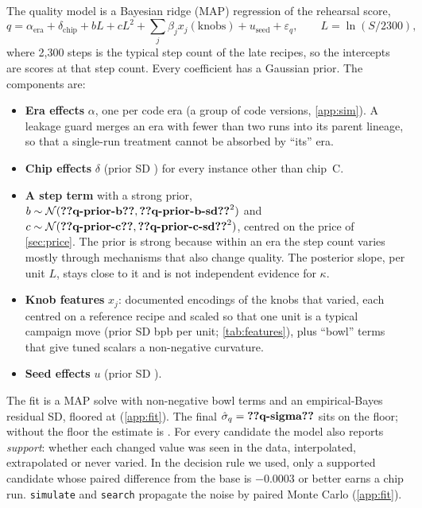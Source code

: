 The quality model is a Bayesian ridge (MAP) regression of the rehearsal score,
\begin{equation}
  \label{eq:quality}
  q = \alpha_{\text{era}} + \delta_{\text{chip}} + b L + c L^2 + \sum_j \beta_j x_j(\text{knobs}) + u_{\text{seed}} + \varepsilon_q,
  \qquad L = \ln(S/2300),
\end{equation}
where 2{,}300 steps is the typical step count of the late recipes, so the intercepts are scores at that step count.
Every coefficient has a Gaussian prior. The components are:
\begin{itemize}
  \item \textbf{Era effects} $\alpha$, one per code era (a group of code versions, \cref{app:sim}). A leakage guard
    merges an era with fewer than two runs into its parent lineage, so that a single-run treatment cannot be absorbed
    by ``its'' era.
  \item \textbf{Chip effects} $\delta$ (prior SD ) for every instance other than chip~C.
  \item \textbf{A step term} with a strong prior, $b\sim\mathcal{N}(\val{q-prior-b}, \val{q-prior-b-sd}^2)$ and
    $c\sim\mathcal{N}(\val{q-prior-c}, \val{q-prior-c-sd}^2)$, centred on the price of \cref{sec:price}. The prior is
    strong because within an era the step count varies mostly through mechanisms that also change quality. The
    posterior slope,  per unit $L$, stays close to it and is not independent evidence for $\kappa$.
  \item \textbf{Knob features} $x_j$:  documented encodings of the knobs that varied, each
    centred on a reference recipe and scaled so that one unit is a typical campaign move (prior SD
     bpb per unit; \cref{tab:features}), plus  ``bowl'' terms that give tuned
    scalars a non-negative curvature.
  \item \textbf{Seed effects} $u$ (prior SD ).
\end{itemize}
The fit is a MAP solve with non-negative bowl terms and an empirical-Bayes residual SD, floored at
 (\cref{app:fit}). The final $\hat\sigma_q=\val{q-sigma}$ sits on the floor; without the floor the
estimate is . For every candidate the model also reports
\emph{support}: whether each changed value was seen in the data, interpolated, extrapolated or never varied. In the
decision rule we used, only a supported candidate whose paired difference from the base is $-0.0003$ or better earns
a chip run. \texttt{simulate} and \texttt{search} propagate the noise by paired Monte Carlo (\cref{app:fit}).

